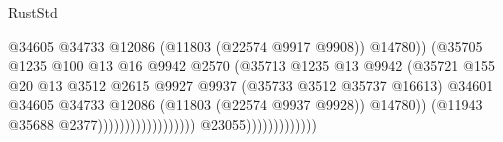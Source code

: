 \begin{lexlean}{RustStd}
\begin{coremodule}
                                                                  @34605
                                                                  @34733
                                                                  @12086
                                                                  (@11803 (@22574 @9917 @9908))
                                                                  @14780))
                                                              (@35705
                                                                @1235
                                                                @100
                                                                @13
                                                                @16
                                                                @9942
                                                                @2570
                                                                (@35713
                                                                  @1235
                                                                  @13
                                                                  @9942
                                                                  (@35721
                                                                    @155
                                                                    @20
                                                                    @13
                                                                    @3512
                                                                    @2615
                                                                    @9927
                                                                    @9937
                                                                    (@35733 @3512 @35737 @16613)
                                                                    @34601
                                                                    @34605
                                                                    @34733
                                                                    @12086
                                                                    (@11803 (@22574 @9937 @9928))
                                                                    @14780))
                                                                (@11943
                                                                  @35688
                                                                  @2377))))))))))))))))))
                              @23055)))))))))))))

\end{coremodule}
\end{lexlean}
